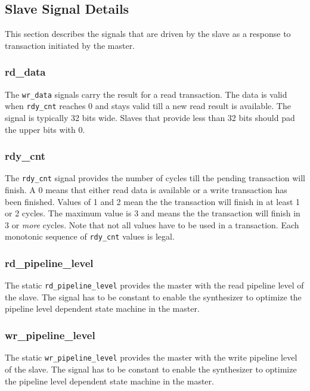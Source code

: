 \documentclass[a4paper,12pt]{scrartcl}
\newcommand{\sign}[1]{{\texttt{#1}}}
\begin{document}
\subsection{Slave Signal Details}

This section describes the signals that are driven by the slave as a
response to transaction initiated by the master.

\subsubsection{rd\_data}

The \sign{wr\_data} signals carry the result for a read transaction.
The data is valid when \sign{rdy\_cnt} reaches 0 and stays valid
till a new read result is available. The signal is typically 32 bits
wide. Slaves that provide less than 32 bits should pad the upper
bits with 0.

\subsubsection{rdy\_cnt}

The \sign{rdy\_cnt} signal provides the number of cycles till the
pending transaction will finish. A 0 means that either read data is
available or a write transaction has been finished. Values of 1 and
2 mean the the transaction will finish in at least 1 or 2 cycles.
The maximum value is 3 and means the the transaction will finish in
3 or \emph{more} cycles. Note that not all values have to be used in
a transaction. Each monotonic sequence of \sign{rdy\_cnt} values is
legal.

\subsubsection{rd\_pipeline\_level}

The static \sign{rd\_pipeline\_level} provides the master with the
read pipeline level of the slave. The signal has to be constant to
enable the synthesizer to optimize the pipeline level dependent
state machine in the master.


\subsubsection{wr\_pipeline\_level}

The static \sign{wr\_pipeline\_level} provides the master with the
write pipeline level of the slave. The signal has to be constant to
enable the synthesizer to optimize the pipeline level dependent
state machine in the master.
\end{document}
